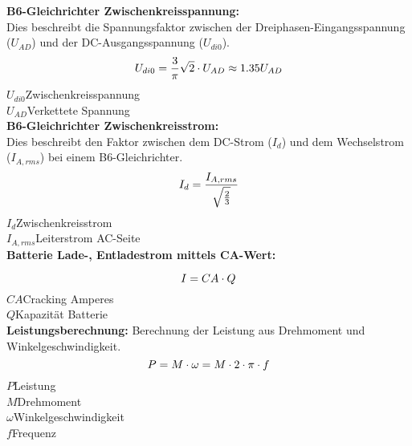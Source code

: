 \textbf{B6-Gleichrichter Zwischenkreisspannung:}\\
Dies beschreibt die Spannungsfaktor zwischen der Dreiphasen-Eingangsspannung ($ U_{AD} $) und der DC-Ausgangsspannung ($  U_{di0} $).
\begin{equation}
	\centering
	U_{di0}=\frac{3}{\pi}\sqrt{2}\cdot U_{AD}\approx 1.35U_{AD}
	\label{eq:B6-Ud}
\end{equation}
$  U_{di0} $\quad  Zwischenkreisspannung        \\
$ U_{AD} $\quad  Verkettete Spannung        \\

\textbf{B6-Gleichrichter Zwischenkreisstrom:}\\
Dies beschreibt den Faktor zwischen dem DC-Strom ($ I_{d} $) und dem Wechselstrom ($ I_{A,rms}$) bei einem B6-Gleichrichter.
\begin{equation}
	\centering
	I_{d}=\frac{I_{A,rms}}{\sqrt{\frac{2}{3}}}
	\label{eq:B6-Id}
\end{equation}
$ I_{d} $\qquad\quad 	Zwischenkreisstrom      \\
$ I_{A,rms} $\quad Leiterstrom AC-Seite    \\

\textbf{Batterie Lade-, Entladestrom mittels CA-Wert:}

\begin{equation}
	\centering
	I=CA \cdot Q
	\label{eq:CA}
\end{equation}
$ CA $\quad 	Cracking Amperes      \\
$ Q $\qquad  Kapazität Batterie     \\

\textbf{Leistungsberechnung:}
Berechnung der Leistung aus Drehmoment und Winkelgeschwindigkeit.
\begin{equation}
\centering
P = M \cdot \omega = M \cdot 2 \cdot \pi\cdot f
\label{eq:Leistung}
\end{equation}
$P$\quad 		Leistung		\\
$M$\quad  Drehmoment  \\
$\omega$\quad  Winkelgeschwindigkeit\\
$f$\quad  Frequenz	\\
